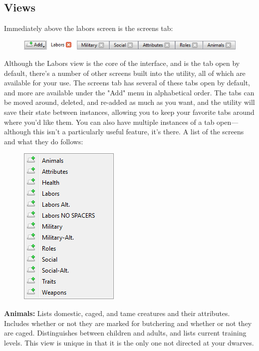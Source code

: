 \documentclass[]{article}
\begin{document}
\newpage
\subsection{Views}
\label{sec:Screens Tab}
Immediately above the labors screen is the screens tab:
\begin{figure}[h!]
\centering
\includegraphics[scale=1]{Sec1Fig9}
\end{figure}

Although the Labors view is the core of the interface, and is the tab open by default, there's a number
of other screens built into the utility, all of which are available for your use. The screens tab has
several of these tabs open by default, and more are available under the "Add" menu in alphabetical order.
The tabs can be moved around, deleted, and re-added as much as you want, and the utility will save their
state between instances, allowing you to keep your favorite tabs around where you'd like them. You can
also have multiple instances of a tab open---although this isn't a particularly useful feature, it's
there. A list of the screens and what they do follows:

\begin{figure}
\vspace{-20pt}
  \begin{center}
    \includegraphics{Sec1Fig10}
  \end{center}
\vspace{-10pt}
\end{figure}
\noindent\textbf{Animals:} Lists domestic, caged, and tame creatures and their attributes. Includes
whether or not they are marked for butchering and whether or not they are caged. Distinguishes between
children and adults, and lists current training levels. This view is unique in that it is the only one
not directed at your dwarves.
\end{document}
